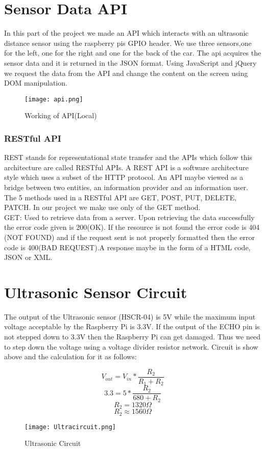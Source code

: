 \section{Sensor Data API}
In this part of the project we made an API which interacts with an ultrasonic distance sensor using the raspberry pis GPIO header. We use three 
sensors,one for the left, one for the right and one for the back of the car. The api acquires the sensor data and it is returned in the JSON format. 
Using JavaScript and jQuery we request the data from the API and change the content on the screen using DOM manipulation.
\begin{figure}[h]
\centering
\texttt{[image: api.png]}
\caption{Working of API(Local)}
\end{figure}
\subsubsection*{RESTful API}
REST stands for representational state transfer and the APIs which follow this architecture are called RESTful APIs. A REST API is a software architecture 
style which uses a subset of the HTTP protocol. An API maybe viewed as a bridge between two entities, an information provider and an information user. 
The 5 methods used in a RESTful API are GET, POST, PUT, DELETE, PATCH.
In our project we make use only of the GET method.\\
GET: Used to retrieve data from a server. Upon retrieving the data successfully the error code given is 200(OK). If the resource is not found the error code is 404 (NOT FOUND) and if the request sent is not properly formatted then the error code is 400(BAD REQUEST).A response maybe in the form of a HTML code, JSON or XML.

\section{Ultrasonic Sensor Circuit}
The output of the Ultrasonic sensor (HSCR-04) is 5V while the maximum input voltage acceptable by the Raspberry Pi is 3.3V. If the output of the ECHO pin is not stepped down to 3.3V then the Raspberry Pi can get damaged.
Thus we need to step down the voltage using a voltage divider resistor network. Circuit is show above and the calculation for it as follows:

\begin{small}
$$V_{out} = V_{in} * \frac{R_2}{R_1 + R_2}$$
$$3.3 = 5 * \frac{R_2}{680 + R_2}$$
$$R_2 = 1320 \Omega$$
$$R_2 \approx 1560 \Omega$$
\end{small}
\begin{figure}[h]
\centering
\texttt{[image: Ultracircuit.png]}
\caption{Ultrasonic Circuit}
\end{figure}
\vspace{0.1in}
